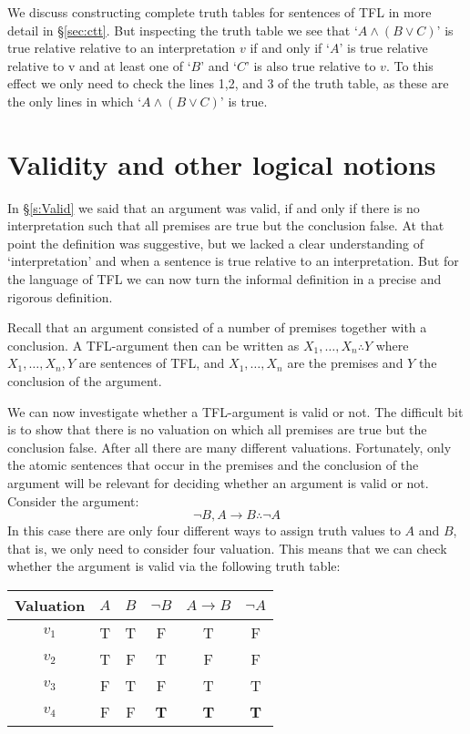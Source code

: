 We discuss constructing complete truth tables for sentences of TFL in more detail in \S\ref{sec:ctt}. But inspecting the truth table we see that `$A\wedge(B\vee C)$' is true relative relative to an interpretation $v$ if and only if `$A$' is true relative relative to v and at least one of `$B$' and `$C$' is also true relative to $v$. To this effect we only need to check the lines 1,2, and 3 of the truth table, as these are the only lines in which `$A\wedge(B\vee C)$' is true. 
 


 
 \section{Validity and other logical notions}
 In \S\ref{s:Valid} we said that an argument was valid, if and only if there is no interpretation such that all premises are true but the conclusion false. At that point the definition was suggestive, but we lacked a clear understanding of `interpretation' and when a sentence is true relative to an interpretation. But for the language of TFL we can now turn the informal definition in a precise and rigorous definition.
 
 Recall that an argument consisted of a number of premises together with a conclusion. A TFL-argument then can be written as $X_1,\ldots,X_n\therefore Y$ where $X_1,\ldots,X_n, Y$ are sentences of TFL, and $X_1,\ldots,X_n$ are the premises and $Y$ the conclusion of the argument.
 
 
 We can now investigate whether a TFL-argument is valid or not. The difficult bit is to show that there is no valuation on which all premises are true but the conclusion false. After all there are many different valuations. Fortunately, only the atomic sentences that occur in the premises and the conclusion of the argument will be relevant for deciding whether an argument is valid or not. Consider the argument:
 $$\neg B,A\rightarrow B\therefore\neg A$$
 In this case there are only four different ways to assign truth values to $A$ and $B$, that is, we only need to consider four valuation. This means that we can check whether the argument is valid via the following truth table:
 
 \begin{center}
\begin{tabular}{c|cc|c|c||c}
Valuation&$A$&$B$&$\neg B$&$A\rightarrow B$&$\neg A$\\\hline
$v_1$&T & T & F & T & F\\
$v_2$&T & F & T & F & F\\
$v_3$&F & T & F & T & T\\
$v_4$&F & F & \textbf{T}& \textbf{T} & \textbf{T}
\end{tabular}
\end{center}

